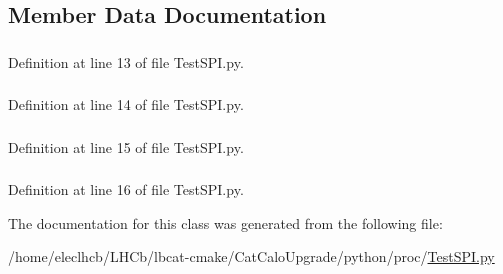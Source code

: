 \subsection{Member Data Documentation}
\hypertarget{classTestSPI_1_1TestSPI_ab25da870d08e4310a12aa4f4afc1cd57}{
\subsubsection[{s1}]{}}
\label{classTestSPI_1_1TestSPI_ab25da870d08e4310a12aa4f4afc1cd57}


Definition at line 13 of file TestSPI.py.\hypertarget{classTestSPI_1_1TestSPI_a0640a3fab135587a250e198b5aac4b26}{
\subsubsection[{s2}]{}}
\label{classTestSPI_1_1TestSPI_a0640a3fab135587a250e198b5aac4b26}


Definition at line 14 of file TestSPI.py.\hypertarget{classTestSPI_1_1TestSPI_a5d667d30be77efbdc231aa2c33b299cd}{
\subsubsection[{s3}]{}}
\label{classTestSPI_1_1TestSPI_a5d667d30be77efbdc231aa2c33b299cd}


Definition at line 15 of file TestSPI.py.\hypertarget{classTestSPI_1_1TestSPI_adb1ecf7362ea0762d556cac4226804d4}{
\subsubsection[{s4}]{}}
\label{classTestSPI_1_1TestSPI_adb1ecf7362ea0762d556cac4226804d4}


Definition at line 16 of file TestSPI.py.

The documentation for this class was generated from the following file:\begin{DoxyCompactItemize}
\item 
/home/eleclhcb/LHCb/lbcat-\/cmake/CatCaloUpgrade/python/proc/\hyperlink{TestSPI_8py}{TestSPI.py}\end{DoxyCompactItemize}
